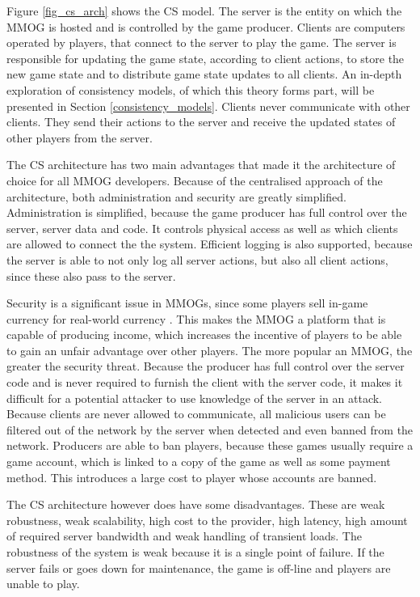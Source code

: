 \documentclass[journal,oneside,a4paper,onecolumn]{IEEEtran}
\begin{document}
Figure \ref{fig_cs_arch} shows the \ac{CS} model. The server is the entity on which the MMOG is hosted and is controlled by the game producer. Clients are computers operated by players, that connect to the server to play the game. The server is responsible for updating the game state, according to client actions, to store the new game state and to distribute game state updates to all clients. An in-depth exploration of consistency models, of which this theory forms part, will be presented in Section \ref{consistency_models}. Clients never communicate with other clients. They send their actions to the server and receive the updated states of other players from the server.

The \ac{CS} architecture has two main advantages that made it the architecture of choice for all MMOG developers. Because of the centralised approach of the architecture, both administration and security are greatly simplified. Administration is simplified, because the game producer has full control over the server, server data and code. It controls physical access as well as which clients are allowed to connect the the system. Efficient logging is also supported, because the server is able to not only log all server actions, but also all client actions, since these also pass to the server.

Security is a significant issue in MMOGs, since some players sell in-game currency for real-world currency \cite{}. This makes the MMOG a platform that is capable of producing income, which increases the incentive of players to be able to gain an unfair advantage over other players. The more popular an MMOG, the greater the security threat. Because the producer has full control over the server code and is never required to furnish the client with the server code, it makes it difficult for a potential attacker to use knowledge of the server in an attack. Because clients are never allowed to communicate, all malicious users can be filtered out of the network by the server when detected and even banned from the network. Producers are able to ban players, because these games usually require a game account, which is linked to a copy of the game as well as some payment method. This introduces a large cost to player whose accounts are banned.

The \ac{CS} architecture however does have some disadvantages. These are weak robustness, weak scalability, high cost to the provider, high latency, high amount of required server bandwidth and weak handling of transient loads. The robustness of the system is weak because it is a single point of failure. If the server fails or goes down for maintenance, the game is off-line and players are unable to play. 
\end{document}
